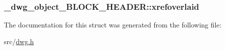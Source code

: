 \hypertarget{struct__dwg__object__BLOCK__HEADER_ae4937f245af0608bc271bbb462ce885a}{
\subsubsection[{xrefoverlaid}]{ {\bf \-\_\-dwg\-\_\-object\-\_\-\-B\-L\-O\-C\-K\-\_\-\-H\-E\-A\-D\-E\-R\-::xrefoverlaid}}}\label{struct__dwg__object__BLOCK__HEADER_ae4937f245af0608bc271bbb462ce885a}


\-The documentation for this struct was generated from the following file\-:\begin{DoxyCompactItemize}
\item 
src/\hyperlink{dwg_8h}{dwg.\-h}\end{DoxyCompactItemize}
